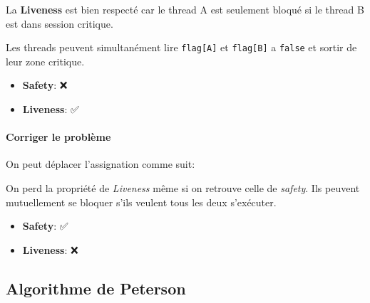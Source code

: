 La \textbf{Liveness} est bien respecté car le thread A est seulement
bloqué si le thread B est dans session critique.

Les threads peuvent simultanément lire \texttt{flag{[}A{]}} et
\texttt{flag{[}B{]}} a \texttt{false} et sortir de leur zone critique.

\begin{itemize}
\tightlist
\item
  \textbf{Safety}: ❌
\item
  \textbf{Liveness}: ✅
\end{itemize}

\paragraph{Corriger le problème}\label{corriger-le-probluxe8me}

On peut déplacer l'assignation comme suit:

\begin{Shaded}
\begin{Highlighting}[]
\OperatorTok{[}\OperatorTok{]=}\OperatorTok{;} 
 \OperatorTok{(}\OperatorTok{[}\OperatorTok{]==}\OperatorTok{)} \OperatorTok{\{} 
\OperatorTok{\}} 
\OperatorTok{();}
\OperatorTok{[}\OperatorTok{]=}\OperatorTok{;}
\end{Highlighting}
\end{Shaded}

On perd la propriété de \emph{Liveness} même si on retrouve celle de
\emph{safety}. Ils peuvent mutuellement se bloquer s'ils veulent tous
les deux s'exécuter.

\begin{itemize}
\tightlist
\item
  \textbf{Safety}: ✅
\item
  \textbf{Liveness}: ❌
\end{itemize}

\subsection{Algorithme de Peterson}\label{algorithme-de-peterson}

